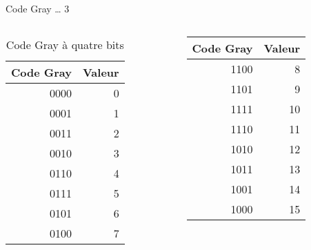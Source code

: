 \documentclass[presentation]{beamer}
\begin{document}
\begin{frame}[label={sec:org265531e}]{Code Gray \ldots{} 3}
\begin{columns}
\begin{column}{0.48\columnwidth}
\begin{block}{}
\begin{table}[htbp]
\caption{\label{tab:org59ec4cd}Code Gray à quatre bits}
\centering
\begin{tabular}{rr}
Code Gray & Valeur\\
\hline
0000 & 0\\
0001 & 1\\
0011 & 2\\
0010 & 3\\
0110 & 4\\
0111 & 5\\
0101 & 6\\
0100 & 7\\
\end{tabular}
\end{table}
\end{block}
\end{column}


\begin{column}{0.48\columnwidth}
\begin{block}{}
\begin{center}
\begin{tabular}{rr}
Code Gray & Valeur\\
\hline
1100 & 8\\
1101 & 9\\
1111 & 10\\
1110 & 11\\
1010 & 12\\
1011 & 13\\
1001 & 14\\
1000 & 15\\
\end{tabular}
\end{center}
\end{block}
\end{column}
\end{columns}
\end{frame}
\end{document}
